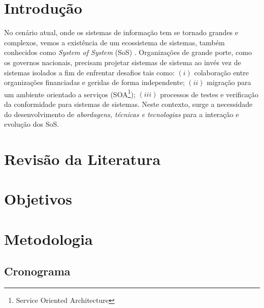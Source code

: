 \documentclass[msc,proposal]{ppgccufmg} %
\begin{document}
\chapter{Introdução}
\label{ch:intro}
No cenário atual, onde os sistemas de informação tem se tornado grandes e complexos, vemos a existência de um ecossistema de sistemas, também conhecidos como \textit{System of System} (SoS) \cite{Nakagawa:2013:SAF:2489850.2489853}. Organizações de grande porte, como os governos nacionais, precisam projetar sistemas de sistema ao invés vez de sistemas isolados a fim de enfrentar desafios tais como: $(i)$ colaboração entre organizações financiadas e geridas de forma independente; $(ii)$ migração para um ambiente orientado a serviços (SOA\footnote{Service Oriented Architecture }); $(iii)$ processos de testes e verificação da conformidade para sistemas de sistemas. Neste contexto, surge a necessidade do desenvolvimento de \textit{abordagens, técnicas e tecnologias} para a interação e evolução dos SoS.
     
     

\chapter{Revisão da Literatura}
\label{ch:revisao}


\chapter{Objetivos}
\label{ch:objetivos}


\chapter{Metodologia}
\label{ch:metodologia}

\begin{attachments}
\chapter{Cronograma}
\label{att:cronograma}
\end{attachments}
\end{document}
